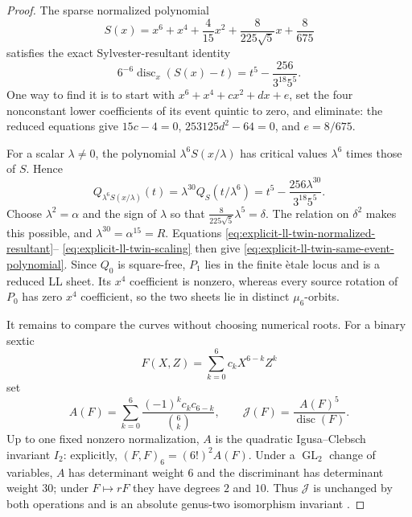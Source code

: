 \begin{proof}
The sparse normalized polynomial
\begin{equation}
 S(x)=x^6+x^4+\frac4{15}x^2
      +\frac8{225\sqrt5}x+\frac8{675}
 \label{eq:explicit-ll-twin-normalized-polynomial}
\end{equation}
satisfies the exact Sylvester-resultant identity
\begin{equation}
 6^{-6}\operatorname{disc}_x(S(x)-t)
 =t^5-\frac{256}{3^{18}5^5}.
 \label{eq:explicit-ll-twin-normalized-resultant}
\end{equation}
One way to find it is to start with
$x^6+x^4+cx^2+dx+e$, set the four nonconstant lower coefficients of
its event quintic to zero, and eliminate: the reduced equations give
$15c-4=0$, $253125d^2-64=0$, and $e=8/675$.

For a scalar $\lambda\ne0$, the polynomial
$\lambda^6S(x/\lambda)$ has critical values $\lambda^6$ times those of
$S$.  Hence
\begin{equation}
 Q_{\lambda^6S(x/\lambda)}(t)
 =\lambda^{30}Q_S(t/\lambda^6)
 =t^5-\frac{256\lambda^{30}}{3^{18}5^5}.
 \label{eq:explicit-ll-twin-scaling}
\end{equation}
Choose $\lambda^2=\alpha$ and the sign of $\lambda$ so that
$\frac8{225\sqrt5}\lambda^5=\delta$.  The relation on $\delta^2$ makes
this possible, and $\lambda^{30}=\alpha^{15}=R$.  Equations
\eqref{eq:explicit-ll-twin-normalized-resultant}--
\eqref{eq:explicit-ll-twin-scaling} then give
\eqref{eq:explicit-ll-twin-same-event-polynomial}.  Since $Q_0$ is
square-free, $P_1$ lies in the finite \`etale locus and is a reduced LL sheet.
Its $x^4$ coefficient is nonzero, whereas every source rotation of $P_0$ has
zero $x^4$ coefficient, so the two sheets lie in distinct $\mu_6$-orbits.

It remains to compare the curves without choosing numerical roots.  For a
binary sextic
\begin{equation}
 F(X,Z)=\sum_{k=0}^6 c_kX^{6-k}Z^k
 \label{eq:binary-sextic-for-twin}
\end{equation}
set
\begin{equation}
 A(F)=\sum_{k=0}^6
       \frac{(-1)^kc_kc_{6-k}}{\binom6k},
 \qquad
 \mathcal J(F)=\frac{A(F)^5}{\operatorname{disc}(F)}.
 \label{eq:quadratic-clebsch-absolute-ratio}
\end{equation}
Up to one fixed nonzero normalization, $A$ is the quadratic
Igusa--Clebsch invariant $I_2$: explicitly,
$(F,F)_6=(6!)^2A(F)$.  Under a $\operatorname{GL}_2$ change of variables,
$A$ has determinant weight $6$ and the discriminant has determinant weight
$30$; under $F\mapsto rF$ they have degrees $2$ and $10$.  Thus
$\mathcal J$ is unchanged by both operations and is an absolute genus-two
isomorphism invariant \cite{Igusa1960ArithmeticVariety}.


\end{proof}
